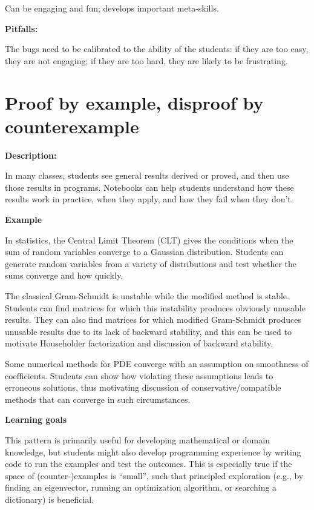 \documentclass[]{book}
\begin{document}
Can be engaging and fun; develops important meta-skills.

\textbf{Pitfalls:}

The bugs need to be calibrated to the ability of the students: if they
are too easy, they are not engaging; if they are too hard, they are
likely to be frustrating.

\section{Proof by example, disproof by
counterexample}\label{proof-by-example-disproof-by-counterexample}

\textbf{Description:}

In many classes, students see general results derived or proved, and
then use those results in programs. Notebooks can help students
understand how these results work in practice, when they apply, and how
they fail when they don't.

\textbf{Example}

In statistics, the Central Limit Theorem (CLT) gives the conditions when
the sum of random variables converge to a Gaussian distribution.
Students can generate random variables from a variety of distributions
and test whether the sums converge and how quickly.

The classical Gram-Schmidt is unstable while the modified method is
stable. Students can find matrices for which this instability produces
obviously unusable results. They can also find matrices for which
modified Gram-Schmidt produces unusable results due to its lack of
backward stability, and this can be used to motivate Householder
factorization and discussion of backward stability.

Some numerical methods for PDE converge with an assumption on smoothness
of coefficients. Students can show how violating these assumptions leads
to erroneous solutions, thus motivating discussion of
conservative/compatible methods that can converge in such circumstances.

\textbf{Learning goals}

This pattern is primarily useful for developing mathematical or domain
knowledge, but students might also develop programming experience by
writing code to run the examples and test the outcomes. This is
especially true if the space of (counter-)examples is ``small'', such
that principled exploration (e.g., by finding an eigenvector, running an
optimization algorithm, or searching a dictionary) is beneficial.
\end{document}
